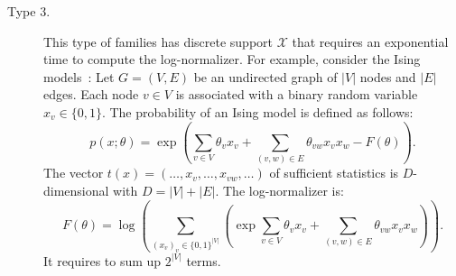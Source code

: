 \documentclass[graybox]{svmult}
\def\calX{\mathcal{X}}
\begin{document}
\begin{description}

\item[Type 3.] This type of families has discrete support $\calX$ that requires an exponential time to compute the log-normalizer.
For example, consider the Ising models~\cite{MRF-1986,Ising-2000,Ising-2018}:
Let $G = (V, E)$ be an undirected graph of $|V|$ nodes and $|E|$ edges. Each node $v\in V$ is associated with a
binary random variable $x_v\in\{0, 1\}$. 
The probability of an Ising model is defined as follows:
\begin{equation}
p(x;\theta)=\exp\left( 
\sum_{v\in V} \theta_v x_v +   \sum_{(v,w)\in E} \theta_{vw} x_vx_w -F(\theta)
 \right).
\end{equation}
The vector $t(x)=(\ldots,x_v,\ldots,x_{vw},\ldots)$ of sufficient statistics is $D$-dimensional with $D=|V|+|E|$.
The log-normalizer is:
\begin{equation}
F(\theta)=\log\left(
\sum_{(x_v)_v\in\{0,1\}^{|V|}} \left( \exp \sum_{v\in V} \theta_vx_v +   \sum_{(v,w)\in E} \theta_{vw}x_vx_w \right)
\right).
\end{equation}
It requires to sum up $2^{|V|}$ terms.


\end{description}
\end{document}

